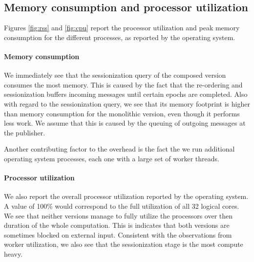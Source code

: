\subsection{Memory consumption and processor utilization}

Figures \ref{fig:rss} and \ref{fig:cpu} report the processor utilization and peak
memory consumption for the different processes, as reported by the operating
system.

\paragraph{Memory consumption}

We immediately see that the sessionization query of the composed version
consumes the most memory. This is caused by the fact that the re-ordering
and sessionization buffers incoming messages until certain epochs are completed.
Also with regard to the sessionization query, we see that its memory footprint
is higher than memory consumption for the monolithic version, even though
it performs less work. We assume that this is caused by the queuing of
outgoing messages at the publisher.

Another contributing factor to the overhead is the fact the we run additional
operating system processes, each one with a large set of worker threads.


\paragraph{Processor utilization}

We also report the overall processor utilization reported by the operating system.
A value of 100\% would correspond to the full utilization of all 32 logical cores.
We see that neither versions manage to fully utilize the processors over then duration of
the whole computation. This is indicates that both versions are sometimes blocked
on external input. Consistent with the observations from worker utilization, we
also see that the sessionization stage is the most compute heavy.

